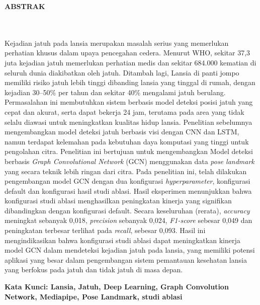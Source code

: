 \clearpage
{}%
\thispagestyle{fancy}

\begin{center}
	\large \bfseries \MakeUppercase{Abstrak}\\
	\normalsize \normalfont {\thetitle}\\
	\normalsize \normalfont {\theauthor}\\
	\bigskip
	
	\normalsize \normalfont \justifying \singlespacing
	Kejadian jatuh pada lansia merupakan masalah serius yang memerlukan perhatian khusus dalam upaya pencegahan cedera. Menurut WHO, sekitar 37,3 juta kejadian jatuh memerlukan perhatian medis dan sekitar 684.000 kematian di seluruh dunia diakibatkan oleh jatuh. Ditambah lagi, Lansia di panti jompo memiliki risiko jatuh lebih tinggi dibanding lansia yang tinggal di rumah, dengan kejadian 30--50\% per tahun dan sekitar 40\% mengalami jatuh berulang. Permasalahan ini membutuhkan sistem berbasis model deteksi posisi jatuh yang cepat dan akurat, serta dapat bekerja 24 jam, terutama pada area yang tidak selalu diawasi untuk meningkatkan kualitas hidup lansia. Penelitian sebelumnya mengembangkan model deteksi jatuh berbasis visi dengan CNN dan LSTM, namun terdapat kelemahan pada kebutuhan daya komputasi yang tinggi untuk pengolahan citra. Penelitian ini bertujuan untuk mengembangkan Model deteksi berbasis \textit{Graph Convolutional Network} (GCN) menggunakan data \textit{pose landmark} yang secara teknik lebih ringan dari citra. Pada penelitian ini, telah dilakukan pengembangan model GCN dengan dua konfigurasi \textit{hyperparameter}, konfigurasi default dan konfigurasi hasil studi ablasi. Hasil eksperimen menunjukkan bahwa konfigurasi studi ablasi menghasilkan peningkatan kinerja yang signifikan dibandingkan dengan konfigurasi default. Secara keseluruhan (rerata), \textit{accuracy} meningkat sebanyak 0,018, \textit{precision} sebanyak 0,024, \textit{F1-score} sebesar 0,049 dan peningkatan terbesar terlihat pada \textit{recall}, sebesar 0,093. Hasil ini mengindikasikan bahwa konfigurasi studi ablasi dapat meningkatkan kinerja model GCN dalam mendeteksi kejadian jatuh pada lansia, yang memiliki potensi aplikasi yang besar dalam pengembangan sistem pemantauan kesehatan lansia yang berfokus pada jatuh dan tidak jatuh di masa depan.
    \vspace{20pt}
    
	\textbf{Kata Kunci: Lansia, Jatuh, Deep Learning, Graph Convolution Network, Mediapipe, Pose Landmark, studi ablasi}
	
	\vfill
	
\end{center}
\clearpage